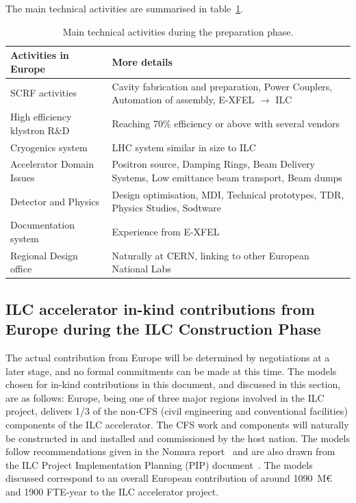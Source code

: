 \documentclass[%
 reprint,
 floatfix,
 amsmath,amssymb,
 aps,
]{revtex4-1}
\begin{document}
The main technical activities are summarised in table~\ref{fig:prep-phase-summary}. 




\begin{table}[htbp]

\begin{tabular}{p{3.5cm}p{4.75cm}}
 \bfseries {Activities in Europe} &\bfseries{More details}                                                         \\[4pt]\hline\noalign{\smallskip}
SCRF activities			&Cavity fabrication and preparation, Power Couplers, Automation of assembly, E-XFEL $\rightarrow$ ILC\\[4pt]
High efficiency klystron R\&D   &Reaching 70\% efficiency or above with several vendors   \\[4pt]
Cryogenics system               &LHC system similar in size to ILC\\[4pt]
Accelerator Domain Issues       &Positron source, Damping Rings, Beam Delivery Systems, Low emittance beam transport, Beam dumps\\[4pt]
Detector and Physics            &Design optimisation, MDI, Technical prototypes, TDR, Physics Studies, Sodtware\\[4pt]
Documentation system            &Experience from E-XFEL                                       \\[4pt]
Regional Design office          &Naturally at CERN, linking to other European National Labs \\[5pt] \hline
\end{tabular}

\caption{\label{fig:prep-phase-summary} Main technical activities during the preparation phase.}
\end{table}


\subsection{ILC accelerator in-kind contributions from Europe during the ILC Construction Phase ~\label{sec:acc:constrphase}}

The actual contribution from Europe will be determined by negotiations at a 
later stage, and no formal commitments can be made at this time. The models 
chosen for in-kind contributions in this document, and discussed in this 
section, are as follows: Europe, being one of three major regions involved in 
the ILC project, delivers 1/3 of the non-CFS (civil engineering and conventional facilities) 
components of the ILC accelerator. The CFS work 
and components will naturally be constructed in and installed and 
commissioned by the host nation. The models follow recommendations given in 
the Nomura report~\cite{Nomura-eng} and are also drawn from the ILC Project Implementation 
Planning (PIP) document~\cite{ILCPIP}. The models discussed correspond to an overall 
European contribution of around 1090~M\euro{} and 1900 FTE-year to the ILC accelerator project. 
\end{document}
